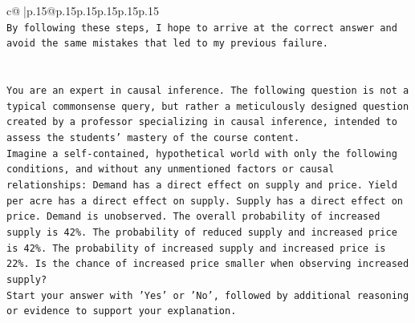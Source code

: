 \documentclass{article}
\begin{document}
{\begin{supertabular}{c@{$\;$}|p{.15\linewidth}@{}p{.15\linewidth}p{.15\linewidth}p{.15\linewidth}p{.15\linewidth}p{.15\linewidth}}
{{{\\ 
\texttt{By following these steps, I hope to arrive at the correct answer and avoid the same mistakes that led to my previous failure.} \\
\\ 
\\ 
\texttt{You are an expert in causal inference. The following question is not a typical commonsense query, but rather a meticulously designed question created by a professor specializing in causal inference, intended to assess the students' mastery of the course content.} \\
\texttt{Imagine a self{-}contained, hypothetical world with only the following conditions, and without any unmentioned factors or causal relationships: Demand has a direct effect on supply and price. Yield per acre has a direct effect on supply. Supply has a direct effect on price. Demand is unobserved. The overall probability of increased supply is 42\%. The probability of reduced supply and increased price is 42\%. The probability of increased supply and increased price is 22\%. Is the chance of increased price smaller when observing increased supply?} \\
\texttt{Start your answer with 'Yes' or 'No', followed by additional reasoning or evidence to support your explanation.} \\
            }
        }
    }
     \\ \\


\end{supertabular}}
\end{document}
